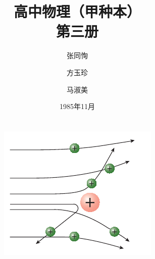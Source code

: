 \documentclass{retypeset}
\begin{document}
	
	
	
	\title{\Huge\bfseries 高中物理（甲种本）\\ 第三册\vspace*{2cm} }
	\author{\Large 张同恂\and \Large 方玉珍\and \Large 马淑美}
	\date{\Large 1985年11月\\~\\~\\ \includegraphics[scale=1.8]{fig/C/cover.pdf}}
	
	\maketitle %
	\tableofcontents %
	\frontmatter
	\mainmatter
	
	
	
	
\end{document}
